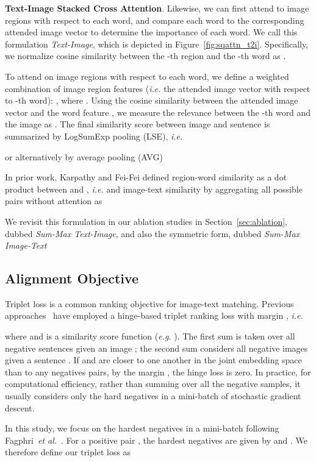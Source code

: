\documentclass[runningheads]{llncs}
\begin{document}
\noindent
\textbf{Text-Image Stacked Cross Attention}. Likewise, we can first attend to image regions with respect to each word, and compare each word to the corresponding attended image vector to determine the importance of each word. We call this formulation \textit{Text-Image}, which is depicted in Figure~\ref{fig:sqattn_t2i}. Specifically, we normalize cosine similarity  between the -th region and the -th word as .

To attend on image regions with respect to each word, we define a weighted combination of image region features ({\em i.e.} the attended image vector  with respect to -th word): , where .
Using the cosine similarity between the attended image vector  and the word feature , we measure the relevance between the -th word and the image as . The final similarity score between image  and sentence  is summarized by LogSumExp pooling (LSE), {\em i.e.}

or alternatively by average pooling (AVG)

In prior work, Karpathy and Fei-Fei \cite{karpathy2015deep} defined region-word similarity as a dot product between  and , {\em i.e.}  and image-text similarity by aggregating all possible pairs without attention as

We revisit this formulation in our ablation studies in Section~\ref{sec:ablation}, dubbed \textit{Sum-Max Text-Image}, and also the symmetric form, dubbed \textit{Sum-Max Image-Text}


\subsection{Alignment Objective}
\label{sec:ali_obj}
Triplet loss is a common ranking objective for image-text matching. Previous approaches~\cite{karpathy2015deep,kiros2014unifying,socher2014grounded} have employed a hinge-based triplet ranking loss with margin , {\em i.e.}

where  and  is a similarity score function (\textit{e.g.} ). The first sum is taken over all negative sentences  given an image ; the second sum considers all negative images  given a sentence . If  and  are closer to one another in the joint embedding space than to any negatives pairs, by the margin , the hinge loss is zero. In practice, for computational efficiency, rather than summing over all the negative samples, it usually considers only the hard negatives in a mini-batch of stochastic gradient descent.

In this study, we focus on the hardest negatives in a mini-batch following Fagphri~\textit{et al.}~\cite{faghri2017vse++}. For a positive pair , the hardest negatives are given by  and . We therefore define our triplet loss as
\end{document}
